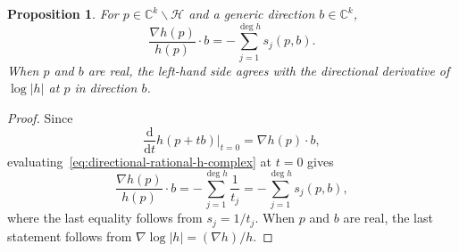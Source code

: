 \documentclass[10pt,a4paper]{amsart}
\newtheorem{proposition}{Proposition}
\newcommand\bC{{\mathbb C}}
\newcommand{\sH}{{\mathcal H}}
\begin{document}
\begin{proposition}
\label{prop:gradient}
For $p\in \bC^{k}\smallsetminus\sH$ and a generic direction $b \in \bC^{k}$,
\begin{equation*}
    \frac{\nabla h(p)}{h(p)} \cdot b = -\sum_{j=1}^{\deg h}s_{j}(p,b).
\end{equation*}
When $p$ and $b$ are real, the left-hand side agrees with the directional derivative of $\log \lvert h\rvert$ at $p$ in direction $b$.
\end{proposition}

\begin{proof}
Since 
\begin{equation*}
\frac{\mathrm{d}}{\mathrm{d}t} h(p +tb)\vert_{t=0} = \nabla h(p)\cdot b,
\end{equation*}
evaluating~\eqref{eq:directional-rational-h-complex} at $t=0$ gives
\begin{equation*}
\frac{\nabla h(p)}{h(p)}\cdot b = -\sum_{j=1}^{\deg h}\frac{1}{t_{j}} = -\sum_{j=1}^{\deg h}s_{j}(p,b),
\end{equation*}
where the last equality follows from $s_j = 1/t_j$. When $p$ and $b$ are real, the last statement follows from $\nabla \log\lvert h\rvert = (\nabla h)/h$.
\end{proof}
\end{document}

